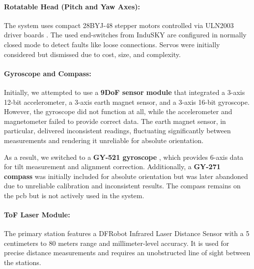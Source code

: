 \paragraph{Rotatable Head (Pitch and Yaw Axes):}
The system uses compact 28BYJ-48 stepper motors controlled via ULN2003 driver boards \cite{angeek_28byj_48}. The used end-switches from InduSKY \cite{indusky_microswitch} are configured in normally closed mode to detect faults like loose connections. Servos \cite{miuzei_servos} were initially considered but dismissed due to cost, size, and complexity.



\paragraph{Gyroscope and Compass:}

Initially, we attempted to use a \textbf{9DoF sensor module} \citep{jwbl_dof_sensor} that integrated a 3-axis 12-bit accelerometer, a 3-axis earth magnet sensor, and a 3-axis 16-bit gyroscope. However, the gyroscope did not function at all, while the accelerometer and magnetometer failed to provide correct data. The earth magnet sensor, in particular, delivered inconsistent readings, fluctuating significantly between measurements and rendering it unreliable for absolute orientation.

As a result, we switched to a \textbf{GY-521 gyroscope} \cite{azdelivery_gy_521}, which provides 6-axis data for tilt measurement and alignment correction. Additionally, a \textbf{GY-271 compass} \cite{azdelivery_gy_271} was initially included for absolute orientation but was later abandoned due to unreliable calibration and inconsistent results. The compass remains on the \acrshort{pcb} but is not actively used in the system.

\paragraph{ToF Laser Module:}
The primary station features a DFRobot Infrared Laser Distance Sensor \cite{dfrobot_ir_sensor} with a 5 centimeters to 80 meters range and millimeter-level accuracy. It is used for precise distance measurements and requires an unobstructed line of sight between the stations.


